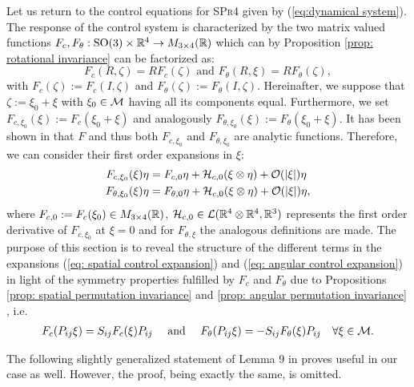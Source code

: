 \label{sec: linearization}
Let us return to the control equations for \textsc{SPr4} given by (\ref{eq:dynamical system}). The response of the control system is characterized by the two matrix valued functions $F_c, F_{\theta}: \operatorname{SO}(3) \times \mathbb{R}^4 \to M_{3 \times 4}(\mathbb{R})$ which can by Proposition \ref{prop: rotational invariance} can be factorized as:
\begin{equation}
\label{eq: reminder control system}
	F_{c}(R, \zeta) = R F_{c}(\zeta) \text{ and } F_{\theta}(R, \xi) = R F_{\theta}(\zeta),
\end{equation}
with $F_{c}(\zeta) := F_c(I, \zeta)$ and $F_{\theta}(\zeta) := F_{\theta}(I, \zeta)$. Hereinafter, we suppose that $\zeta := \xi_0 + \xi$ with $\xi_0 \in \mathcal{M}$ having all its components equal. Furthermore, we set $F_{c, \xi_0}(\xi) := F_{c}(\xi_0 + \xi)$ and analogously $F_{\theta, \xi_0}(\xi) := F_{\theta}(\xi_0 + \xi)$. It has been shown in \cite{Alouges2013} that $F$ and thus both $F_{ c, \xi_0}$ and $F_{\theta, \xi_0}$ are analytic functions. Therefore, we can consider their first order expansions in $\xi$:
\begin{align}
\label{eq: spatial control expansion}
	F_{c, \xi_0}(\xi)\eta &= F_{c, 0} \eta  + \mathcal{H}_{c,0}(\xi \otimes \eta) + \mathcal{O}(|\xi|)\eta\\
\label{eq: angular control expansion}
	F_{\theta, \xi_0}(\xi) \eta &= F_{\theta, 0} \eta + \mathcal{H}_{c, 0}(\xi \otimes \eta) + \mathcal{O}(|\xi|)\eta,
\end{align}
where $F_{c,0} := F_{c}(\xi_0) \in M_{3 \times 4}(\mathbb{R})$, $\mathcal{H}_{c,0}\in \mathcal{L}(\mathbb{R}^4 \otimes \mathbb{R}^4, \mathbb{R}^3)$ represents the first order derivative of $F_{c, \xi_0}$ at $\xi = 0$ and for $F_{\theta, \xi}$ the analogous definitions are made.
The purpose of this section is to reveal the structure of the different terms in the expansions (\ref{eq: spatial control expansion}) and (\ref{eq: angular control expansion}) in light of the symmetry properties fulfilled by $F_{c}$ and $F_{\theta}$ due to Propositions \ref{prop: spatial permutation invariance} and \ref{prop: angular permutation invariance} , i.e.
\begin{align}
\label{eq: spatial and angular first order expansion}
	F_{c}(P_{ij} \xi) = S_{ij} F_{c}(\xi) P_{ij}& & \text{ and } & & 			F_{\theta}(P_{ij} \xi) = - S_{ij} F_{\theta}(\xi) P_{ij} & & \forall \xi \in \mathcal{M}.
\end{align}

The following slightly generalized statement of Lemma 9 in \cite{Alouges2017} proves useful in our case as well. However, the proof, being exactly the same, is omitted.

